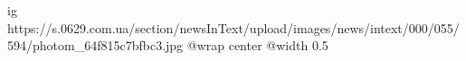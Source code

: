  
 
 
 
 

\ifcmt
  ig https://s.0629.com.ua/section/newsInText/upload/images/news/intext/000/055/594/photom_64f815c7bfbc3.jpg
  @wrap center
  @width 0.5
\fi
